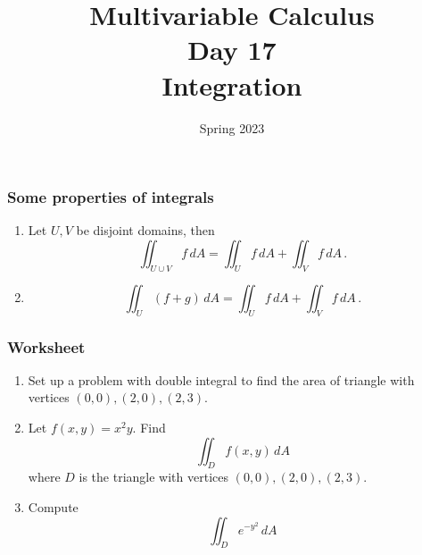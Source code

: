 \documentclass[aspectratio=169]{beamer}
\title{ Multivariable Calculus \\ Day  17\\ Integration }
\date{Spring 2023}
\begin{document}
\maketitle

\begin{frame}
    \frametitle{Some properties of integrals}

    \begin{enumerate}
    \def\labelenumi{\arabic{enumi}.}
    \item
      Let \(U, V\) be disjoint domains, then
      \begin{equation*}
      \iint_{U \cup V} f \, dA = \iint_U f \, dA + \iint_V f\, dA \,. 
      \end{equation*}
    \item
      \begin{equation*}
       \iint_U (f + g) \, dA = \iint_U f \, dA + \iint_V f \, dA \,.
      \end{equation*}
    \end{enumerate}

\end{frame}



\begin{frame}
    \frametitle{Worksheet}
    \begin{enumerate}
        \item Set up a problem with double integral to find the area of triangle with vertices $(0,0), (2,0), (2,3)$.
        \item Let $f(x,y) = x^2y$. Find
            \begin{equation*}
                \iint_D f(x,y) \, dA
            \end{equation*}
            where $D$ is the triangle with vertices $(0,0), (2,0), (2,3)$.
        \item Compute 
            $$ \iint_D e^{-y^2} \, dA $$
    \end{enumerate}

\end{frame}
\end{document}
